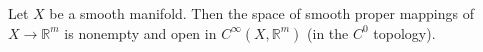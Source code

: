 Let $X$ be a smooth manifold. Then the space of smooth proper mappings of $X \to \mathbb{R}^m$ is nonempty and open in $C^\infty(X, \mathbb{R}^m)$ (in the $C^0$ topology).
